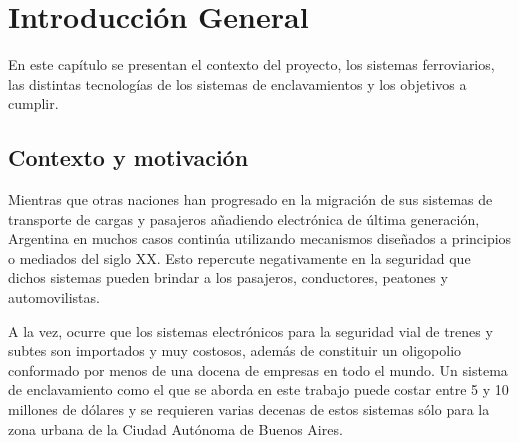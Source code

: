 
\chapter{Introducción General} %

\label{Chapter1} %
\label{IntroGeneral}


\newcommand{\keyword}[1]{\textbf{#1}}
\newcommand{\tabhead}[1]{\textbf{#1}}
\newcommand{\code}[1]{\texttt{#1}}
\newcommand{\file}[1]{\texttt{\bfseries#1}}
\newcommand{\option}[1]{\texttt{\itshape#1}}
\newcommand{\grados}{$^{\circ}$}


En este capítulo se presentan el contexto del proyecto, los sistemas ferroviarios, las distintas tecnologías de los sistemas de enclavamientos y los objetivos a cumplir.

		
	\section{Contexto y motivación}
	
		Mientras que otras naciones han progresado en la migración de sus sistemas de transporte de cargas y pasajeros añadiendo electrónica de última generación, Argentina en muchos casos continúa utilizando mecanismos diseñados a principios o mediados del siglo XX\cite{cite0,cite2}. Esto repercute negativamente en la seguridad que dichos sistemas pueden brindar a los pasajeros, conductores, peatones y automovilistas. 
		
		A la vez, ocurre que los sistemas electrónicos para la seguridad vial de trenes y subtes son importados y muy costosos, además de constituir un oligopolio conformado por menos de una docena de empresas en todo el mundo. Un sistema de enclavamiento como el que se aborda en este trabajo puede costar entre 5 y 10 millones de dólares\citep{SIEMENS} y se requieren varias decenas de estos sistemas sólo para la zona urbana de la Ciudad Autónoma de Buenos Aires.
		
